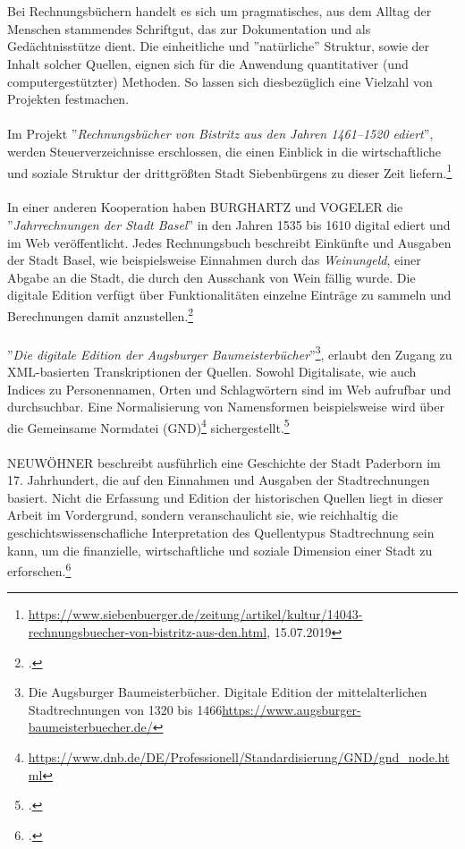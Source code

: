 \documentclass[12pt,a4paper]{article}
\begin{document}
\\
\\
Bei Rechnungsbüchern handelt es sich um pragmatisches, aus dem Alltag der Menschen stammendes Schriftgut, das zur Dokumentation und als Gedächtnisstütze dient. Die einheitliche und ''natürliche'' Struktur, sowie der Inhalt solcher Quellen, eignen sich für die Anwendung quantitativer (und computergestützter) Methoden. So lassen sich diesbezüglich eine Vielzahl von Projekten festmachen.
\\
\\
Im Projekt ''\textit{Rechnungsbücher von Bistritz aus den Jahren 1461–1520 ediert}'', werden Steuerverzeichnisse erschlossen, die einen Einblick in die wirtschaftliche und soziale Struktur der drittgrößten Stadt Siebenbürgens zu dieser Zeit liefern.\footnote{\url{https://www.siebenbuerger.de/zeitung/artikel/kultur/14043-rechnungsbuecher-von-bistritz-aus-den.html}, 15.07.2019}
\\
\\
In einer anderen Kooperation haben BURGHARTZ und VOGELER die ''\textit{Jahrrechnungen der Stadt Basel}'' in den Jahren 1535 bis 1610 digital ediert und im Web veröffentlicht. Jedes Rechnungsbuch beschreibt Einkünfte und Ausgaben der Stadt Basel, wie beispielsweise Einnahmen durch das \textit{Weinungeld}, einer Abgabe an die Stadt, die durch den Ausschank von Wein fällig wurde. Die digitale Edition verfügt über Funktionalitäten einzelne Einträge zu sammeln und  Berechnungen damit anzustellen.\footcite[][S.11-13, \protect\url{https:gams.uni-graz.at/srbas}]{vogeler2016content}
\\
\\
''\textit{Die digitale Edition der Augsburger Baumeisterbücher}''\footnote{Die Augsburger Baumeisterbücher. Digitale Edition der mittelalterlichen Stadtrechnungen von 1320 bis 1466\protect\url{https://www.augsburger-baumeisterbuecher.de/}}, erlaubt den Zugang zu XML-basierten Transkriptionen der Quellen. Sowohl Digitalisate, wie auch Indices zu Personennamen, Orten und Schlagwörtern sind im Web aufrufbar und durchsuchbar. Eine Normalisierung von Namensformen beispielsweise wird über die Gemeinsame Normdatei (GND)\footnote{\protect\url{https://www.dnb.de/DE/Professionell/Standardisierung/GND/gnd_node.html}} sichergestellt.\footcite[][S.109-113]{wurz2016dh}
\\
\\
NEUWÖHNER beschreibt  ausführlich eine Geschichte der Stadt Paderborn im 17. Jahrhundert, die auf den Einnahmen und Ausgaben der Stadtrechnungen basiert. Nicht die Erfassung und Edition der historischen Quellen liegt in dieser Arbeit im Vordergrund, sondern veranschaulicht sie, wie reichhaltig die geschichtswissenschafliche Interpretation des Quellentypus Stadtrechnung sein kann, um die finanzielle, wirtschaftliche und soziale Dimension einer Stadt zu erforschen.\footcite[][S.11-50]{neuwohner2016rechnen}  
\end{document}
